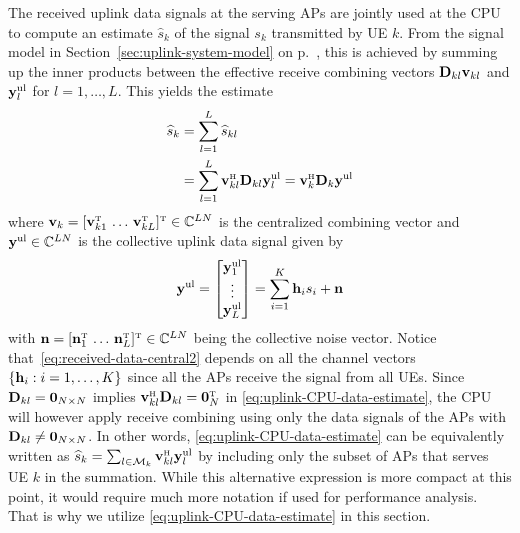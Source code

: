 The received uplink data signals at the serving APs are jointly used at the CPU to compute an estimate $\widehat{s}_{k}$ of the signal $s_k$ transmitted by UE $k$. From the signal model in Section~\ref{sec:uplink-system-model} on p.~\pageref{sec:uplink-system-model}, this is achieved by summing up the inner products between the effective receive combining vectors $\mathbf{D}_{kl}\mathbf{v}_{kl}$ and $\mathbf{y}_{l}^{\rm{ul}}$ for $l=1,\ldots,L$. This yields the estimate 
\begin{align} \notag
\widehat{s}_{k} &=  \sum\limits_{l=1}^L\widehat{s}_{kl} \\ &= \sum\limits_{l=1}^L\vect{v}_{kl}^{\Htran} \vect{D}_{kl} {\bf y}_{l}^{\rm{ul}} = \vect{v}_{k}^{\Htran} \vect{D}_{k} {\bf y}^{\rm{ul}}\label{eq:uplink-CPU-data-estimate}
\end{align}
where $\vect{v}_{k} = [\vect{v}_{k1}^{\Ttran} \, \ldots \, \vect{v}_{kL}^{\Ttran}]^{\Ttran} \in \mathbb{C}^{LN}$ is the centralized combining vector and $\mathbf{y}^{\rm{ul}} \in \mathbb{C}^{LN}$ is the collective uplink data signal given by
\begin{equation} \label{eq:received-data-central2}
\mathbf{y}^{\rm{ul}} = \begin{bmatrix} \mathbf{y}_{1}^{\rm{ul}} \\ \vdots \\ \mathbf{y}_{L}^{\rm{ul}} 
	\end{bmatrix} = \sum_{i=1}^{K} \mathbf{h}_{i} s_i + \mathbf{n}
\end{equation}
with $\vect{n} = [\vect{n}_{1}^{\Ttran} \, \ldots \, \vect{n}_{L}^{\Ttran}]^{\Ttran} \in \mathbb{C}^{LN}$ being the collective noise vector. Notice that~\eqref{eq:received-data-central2} depends on all the channel vectors $\{\mathbf{h}_{i}: i=1,\ldots,K\}$ since all the APs receive the signal from all UEs. Since $ \mathbf{D}_{kl}=\mathbf{0}_{N\times N}$ implies $\vect{v}_{kl}^{\Htran} \vect{D}_{kl} =\vect{0}_N^{\Ttran}$ in \eqref{eq:uplink-CPU-data-estimate}, the CPU will however apply receive combining 
using only the data signals of the APs with $ \mathbf{D}_{kl} \neq \mathbf{0}_{N \times N}$. In other words, \eqref{eq:uplink-CPU-data-estimate} can be equivalently written as  $\widehat{s}_{k}  =  \sum_{l \in \mathcal{M}_k} \vect{v}_{kl}^{\Htran} {\bf y}_{l}^{\rm{ul}}$ by including only the subset of APs that serves UE $k$ in the summation.
While this alternative expression is more compact at this point, it would require much more notation if used for performance analysis. That is why we utilize \eqref{eq:uplink-CPU-data-estimate} in this section.

